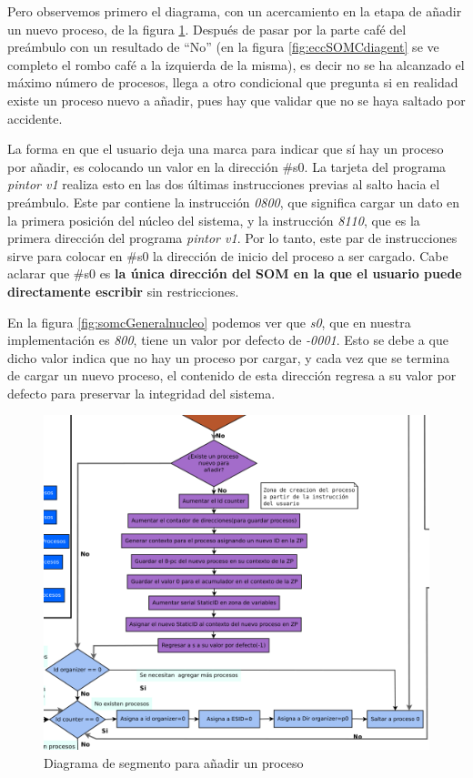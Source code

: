 \documentclass[letterpaper,12pt,oneside]{book}
\begin{document}
            Pero observemos
			primero el diagrama, con un acercamiento en la etapa de añadir un nuevo proceso, de la figura \ref{fig:diagAddnewprocess}. Después
			de pasar por la parte café del preámbulo con un resultado de ``No'' (en la figura \ref{fig:eccSOMCdiagent} se ve completo
			el rombo café a la izquierda de la misma), es decir no se ha alcanzado el máximo número de procesos,
			llega a otro condicional que pregunta si en realidad existe un proceso nuevo a añadir, pues hay que validar que no se haya saltado por
			accidente.
			
			La forma  en que el usuario deja una marca para indicar que sí hay un proceso por añadir, es colocando un valor
			en la dirección \#s0. La tarjeta del programa \textit{pintor v1} realiza esto en las dos últimas instrucciones previas
			al salto hacia el preámbulo. Este par contiene la instrucción \textit{0800}, que significa cargar un dato en la primera posición del núcleo 
			del sistema,
			y la instrucción \textit{8110}, que es la primera dirección del programa \textit{pintor v1}. Por lo tanto, este par de instrucciones
			sirve para colocar en \#s0 la dirección de inicio del proceso a ser cargado. Cabe aclarar que \#s0
			es \textbf{la única
			dirección del SOM en la que el usuario puede directamente escribir} sin restricciones.
   
            En la figura \ref{fig:somcGeneralnucleo}
			podemos ver que \textit{s0}, que en nuestra implementación es \textit{800}, tiene un valor por defecto de \textit{-0001}. Esto se debe a que 
			dicho valor indica que no hay un proceso por cargar, y cada vez que se termina de cargar un nuevo proceso, el contenido de esta dirección 
			regresa a su valor por defecto para preservar la integridad del sistema.
			

		\begin{figure}[h]		
			\centering
			\includegraphics[scale=0.4]{media/CARDIACC/DiagAddNewProcces.png}
			\caption{Diagrama de segmento para añadir un proceso}
			\label{fig:diagAddnewprocess}
		\end{figure}
\end{document}
